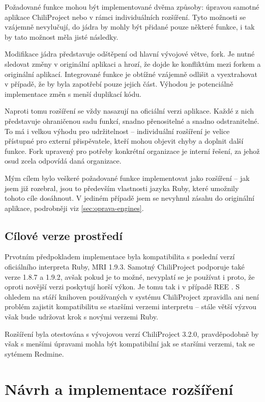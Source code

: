 \documentclass[thesis=B,czech]{FITthesis}[2012/05/02]
\begin{document}
Požadované funkce mohou být implementované dvěma způsoby: úpravou
samotné aplikace ChiliProject nebo v rámci individuálních rozšíření.
Tyto možnosti se vzájemně nevylučují, do jádra by mohly být přidané
pouze některé funkce, i tak by tato možnost měla jisté následky.

Modifikace jádra představuje odštěpení od hlavní vývojové větve,
\gls{fork}. Je nutné sledovat změny v originální aplikaci a hrozí, že
dojde ke konfliktům mezi forkem a originální aplikací. Integrované
funkce je obtížné vzájemně odlišit a vyextrahovat v případě, že by byla
zapotřebí pouze jejich část. Výhodou je potenciálně 
implementace změn s menší duplikací kódu.

Naproti tomu rozšíření se vždy nasazují na oficiální verzi aplikace.
Každé z nich představuje ohraničenou sadu funkcí, snadno přenositelné a
snadno odstranitelné. To má i velkou výhodu pro udržitelnost --
individuální rozšíření je velice přístupné pro externí přispěvatele,
kteří mohou objevit chyby a doplnit další funkce. Fork upravený pro
potřeby konkrétní organizace je interní řešení, za jehož osud zcela
odpovídá daná organizace.

Mým cílem bylo veškeré požadované funkce implementovat jako rozšíření --
jak jsem již rozebral, jsou to především vlastnosti jazyka Ruby, které
umožnily tohoto cíle dosáhnout. V jediném případě jsem se nevyhnul
zásahu do originální aplikace, podrobněji viz
\ref{sec:oprava-engines}.

\section{Cílové verze prostředí}

Prvotním předpokladem implementace byla kompatibilita s poslední verzí
oficiálního interpreta Ruby, \gls{MRI} 1.9.3. Samotný ChiliProject
podporuje také verze 1.8.7 a 1.9.2, avšak pokud je to možné, nevyplatí se
je používat i proto, že oproti novější verzi poskytují horší výkon. Je tomu
tak i v případě \gls{REE} \citep[End of Life]{REEEOL}. S ohledem na stáří
knihoven používaných v systému ChiliProject zpravidla ani není problém
zajistit kompatibilitu se staršími verzemi interpretu -- stále větší
výzvou však bude udržovat krok s novými verzemi Ruby.

Rozšíření byla otestována s vývojovou verzí ChiliProject 3.2.0,
pravděpodobně by však s menšími úpravami mohla být kompatibilní jak se
staršími verzemi, tak se sytémem Redmine.

\chapter{Návrh a implementace rozšíření}
\end{document}
